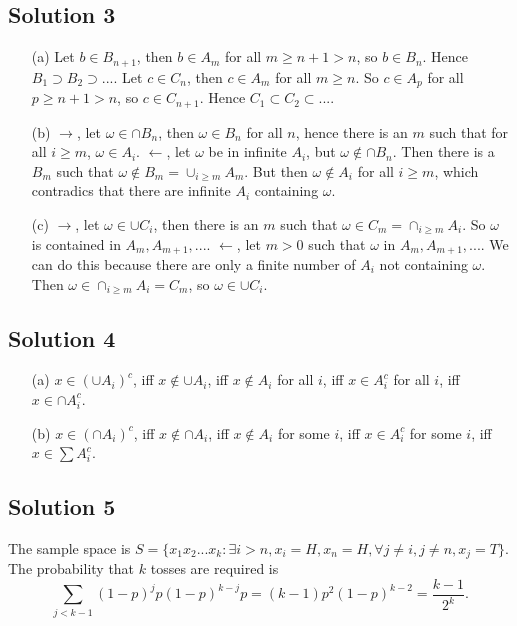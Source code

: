 \subsection*{Solution 3}

\begin{itemize}
    \item[(a)] Let $b \in B_{n+1}$, then $b \in A_m$ for all $m \geq n + 1 > n$, so $b \in B_n$.
        Hence $B_1 \supset B_2 \supset ...$.
        Let $c \in C_n$, then $c \in A_m$ for all $m \geq n$.
        So $c \in A_p$ for all $p \geq n + 1 > n$, so $c \in C_{n+1}$.
        Hence $C_1 \subset C_2 \subset ...$.
    \item[(b)] $\rightarrow$, let $\omega \in \cap B_n$, then $\omega \in B_n$ for all $n$, hence there is an $m$ such that for all $i \geq m$, $\omega \in A_i$.
        $\leftarrow$, let $\omega$ be in infinite $A_i$, but $\omega \notin \cap B_n$.
        Then there is a $B_m$ such that $\omega \notin B_m = \cup_{i \geq m} A_m$.
        But then $\omega \notin A_i$ for all $i \geq m$, which contradics that there are infinite $A_i$ containing $\omega$.
    \item[(c)] $\rightarrow$, let $\omega \in \cup C_i$, then there is an $m$ such that $\omega \in C_m = \cap_{i \geq m} A_i$.
        So $\omega$ is contained in $A_m, A_{m+1}, ...$.
        $\leftarrow$, let $m > 0$ such that $\omega$ in $A_m, A_{m+1}, ...$.
        We can do this because there are only a finite number of $A_i$ not containing $\omega$.
        Then $\omega \in \cap_{i \geq m} A_i = C_m$, so $\omega \in \cup C_i$.

\end{itemize}


\subsection*{Solution 4}

\begin{itemize}
    \item[(a)] $x \in (\cup A_i)^c$, iff $x \notin \cup A_i$, iff $x \notin A_i$ for all $i$, iff $x \in A_i^c$ for all $i$, iff $x \in \cap A_i^c$.
    \item[(b)] $x \in (\cap A_i)^c$, iff $x \notin \cap A_i$, iff $x \notin A_i$ for some $i$, iff $x \in A_i^c$ for some $i$, iff $x \in \sum A_i^c$.
\end{itemize}


\subsection*{Solution 5}

The sample space is $S = \{ x_1 x_2 ... x_k : \exists i > n, x_i = H, x_n = H, \forall j \neq i, j \neq n, x_j = T\}$.
The probability that $k$ tosses are required is
\begin{equation*}
    \sum_{j < k - 1} (1 - p)^j p (1 - p)^{k - j} p
        = (k - 1) p^2 (1 - p)^{k - 2}
        = \frac{k - 1}{2^k}.
\end{equation*}
